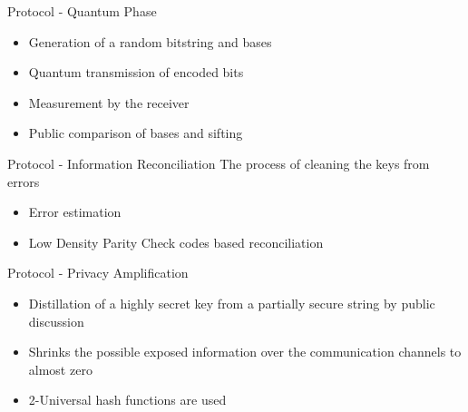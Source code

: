 \documentclass{beamer}
\begin{document}
\begin{frame}{Protocol - Quantum Phase}
    \begin{itemize}[<+->]
        \item Generation of a random bitstring and bases 
		\item Quantum transmission of encoded bits
		\item Measurement by the receiver
		\item Public comparison of bases and sifting
	\end{itemize}
\end{frame}


\begin{frame}{Protocol - Information Reconciliation}
	The process of cleaning the keys from errors
	\begin{itemize}[<+->]
		\item Error estimation
		\item Low Density Parity Check codes based reconciliation
	\end{itemize}
\end{frame}


\begin{frame}{Protocol - Privacy Amplification}
	\begin{itemize}[<+->]
	    \item Distillation of a highly secret key from a partially secure string by public discussion
		\item Shrinks the possible exposed information over the communication channels to almost zero
		\item 2-Universal hash functions are used
	\end{itemize}
\end{frame}
\end{document}
